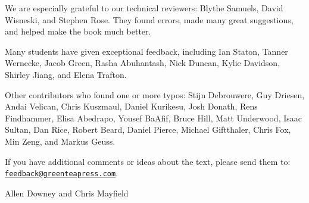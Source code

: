 We are especially grateful to our technical reviewers: Blythe Samuels, David Wisneski, and Stephen Rose.
They found errors, made many great suggestions, and helped make the book much better.

Many students have given exceptional feedback, including Ian Staton, Tanner Wernecke, Jacob Green, Rasha Abuhantash, Nick Duncan, Kylie Davidson, Shirley Jiang, and Elena Trafton.

Other contributors who found one or more typos: Stijn Debrouwere, Guy Driesen, Andai Velican, Chris Kuszmaul, Daniel Kurikesu, Josh Donath, Rens Findhammer, Elisa Abedrapo, Yousef BaAfif, Bruce Hill, Matt Underwood, Isaac Sultan, Dan Rice, Robert Beard, Daniel Pierce, Michael Giftthaler, Chris Fox, Min Zeng, and Markus Geuss.


If you have additional comments or ideas about the text, please send them to: \href{mailto:feedback@greenteapress.com}{\tt feedback@greenteapress.com}.

Allen Downey and Chris Mayfield

